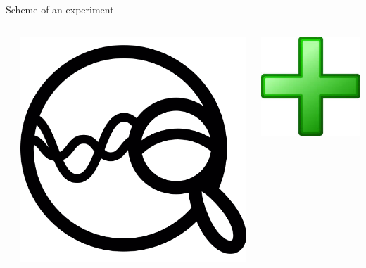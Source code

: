 \documentclass[8pt,pdf,hyperref={unicode}]{beamer}
\begin{document}
\begin{frame}
\begin{block}{Scheme of an experiment}
\begin{columns}
\begin{column}{0.05\textwidth}
        \end{column}
        \begin{column}{0.15\textwidth}
            \includegraphics[width=1\textwidth]{image/search.png}\\
        \end{column}
        \begin{column}{0.05\textwidth}
            \includegraphics[width=1\textwidth]{image/plus.jpeg}

\end{column}
\end{columns}
\end{block}
\end{frame}
\end{document}
